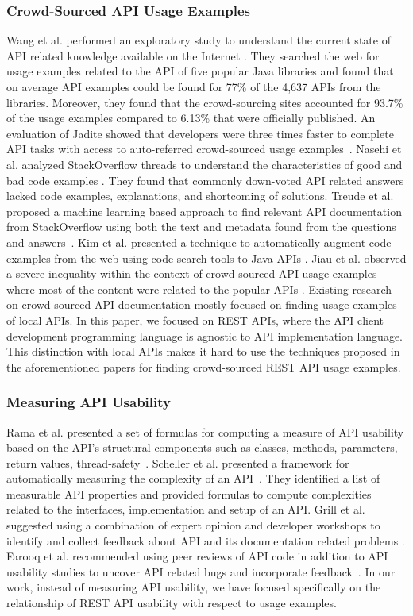 \subsubsection{Crowd-Sourced API Usage Examples}
Wang et al. performed an exploratory study to understand the current state of API related knowledge available on the Internet \cite{6462686}. They searched the web for usage examples related to the API of five popular Java libraries and found that on average API examples could be found for 77\% of the 4,637 APIs from the libraries. Moreover, they found that the crowd-sourcing sites accounted for 93.7\% of the usage examples compared to 6.13\% that were officially published. An evaluation of Jadite showed that developers were three times faster to complete API tasks with access to auto-referred crowd-sourced usage examples~\cite{5295283}. Nasehi et al. analyzed StackOverflow threads to understand the characteristics of good and bad code examples \cite{Nasehi_what_makes}. They found that commonly down-voted API related answers lacked code examples, explanations, and shortcoming of solutions. Treude et al. proposed a machine learning based approach to find relevant API documentation from StackOverflow using both the text and metadata found from the questions and answers~\cite{Treude:2016:AAD:2884781.2884800}. Kim et al. presented a technique to automatically augment code examples from the web using code search tools to Java APIs \cite{Kim:2009:AEJ:1747491.1747552}. Jiau et al. observed a severe inequality within the context of crowd-sourced API usage examples where most of the content were related to the popular APIs \cite{jiau}. Existing research on crowd-sourced API documentation mostly focused on finding usage examples of local APIs. In this paper, we focused on REST APIs, where the API client development programming language is agnostic to API implementation language. This distinction with local APIs makes it hard to use the techniques proposed in the aforementioned papers for finding crowd-sourced REST API usage examples.

\subsubsection{Measuring API Usability}
Rama et al. presented a set of formulas for computing a measure of API usability based on the API's structural components such as classes, methods, parameters, return values, thread-safety~\cite{rama}. Scheller et al. presented a framework for automatically measuring the complexity of an API~\cite{scheller2015automated}. They identified a list of measurable API properties and provided formulas to compute complexities related to the interfaces, implementation and setup of an API. Grill et al. suggested using a combination of expert opinion and developer workshops to identify and collect feedback about API and its documentation related problems \cite{Grill2012}. Farooq et al. recommended using peer reviews of API code in addition to API usability studies to uncover API related bugs and incorporate feedback~\cite{Farooq:2010:AUP:1753326.1753677}. In our work, instead of measuring API usability, we have focused specifically on the relationship of REST API usability with respect to usage examples.

